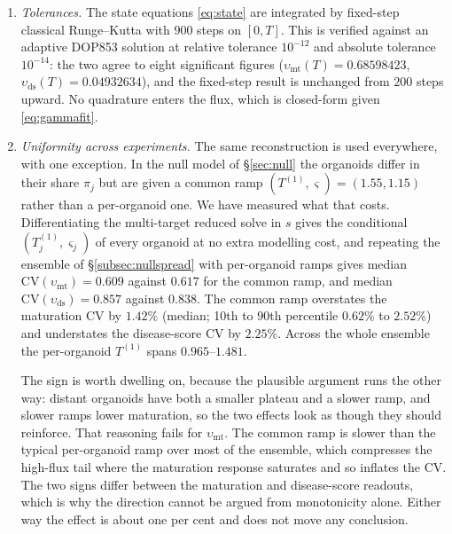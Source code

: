 \documentclass[pdflatex,sn-mathphys-num]{sn-jnl}
\numberwithin{equation}{section}
\theoremstyle{thmstyleone}%
\theoremstyle{definition}
\theoremstyle{remark}
\begin{document}
\begin{enumerate}[label=(\roman*)]
\item \emph{Tolerances.} The state equations \eqref{eq:state} are integrated by fixed-step classical Runge--Kutta with $900$ steps on $[0,T]$. This is verified against an adaptive DOP853 solution at relative tolerance $10^{-12}$ and absolute tolerance $10^{-14}$: the two agree to eight significant figures ($\upsilon_{\mathrm{mt}}(T)=0.68598423$, $\upsilon_{\mathrm{ds}}(T)=0.04932634$), and the fixed-step result is unchanged from $200$ steps upward. No quadrature enters the flux, which is closed-form
given \eqref{eq:gammafit}.
\item \emph{Uniformity across experiments.} The same reconstruction is used everywhere, with one exception. In the null model of \S\ref{sec:null} the organoids differ in their share $\pi_j$ but are given a common ramp $(T^{(1)},\varsigma)=(1.55,1.15)$ rather than a per-organoid one. We have measured what that costs. Differentiating the multi-target reduced solve in $s$ gives the conditional $(T^{(1)}_j,\varsigma_j)$ of every organoid at no extra modelling cost, and repeating the ensemble of \S\ref{subsec:nullspread} with per-organoid ramps gives median $\mathrm{CV}(\upsilon_{\mathrm{mt}})=0.609$ against $0.617$ for the common ramp, and median $\mathrm{CV}(\upsilon_{\mathrm{ds}})=0.857$ against $0.838$. The common ramp overstates the maturation CV by $1.42\%$ (median; 10th to 90th percentile $0.62\%$ to $2.52\%$) and understates the disease-score CV by
$2.25\%$. Across the whole ensemble the per-organoid $T^{(1)}$ spans $0.965$--$1.481$.

The sign is worth dwelling on, because the plausible argument runs the other
way: distant organoids have both a smaller plateau and a slower ramp, and
slower ramps lower maturation, so the two effects look as though they should
reinforce. That reasoning fails for $\upsilon_{\mathrm{mt}}$. The common ramp is slower than the typical
per-organoid ramp over most of the ensemble, which compresses the high-flux tail
where the maturation response saturates and so inflates the CV. The two signs
differ between the maturation and disease-score readouts, which is why the
direction cannot be argued from monotonicity alone. Either way the effect is
about one per cent and does not move any conclusion.
\end{enumerate}
\end{document}
